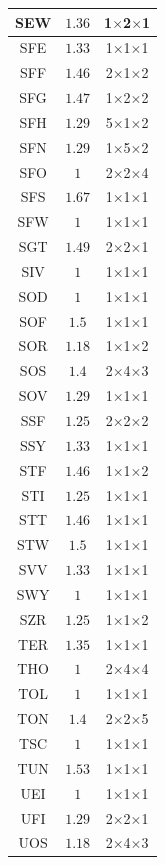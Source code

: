 \documentclass[main.tex]{subfiles}
\begin{document}
\begin{table}
{\begin{minipage}[t]{0.24\linewidth}
\begin{tabular}{|@{\hspace{2pt}}c@{\hspace{2pt}}|@{\hspace{2pt}}c@{\hspace{2pt}}|@{\hspace{2pt}}c@{\hspace{5pt}}|}
SEW&$1.36$&1$\times$2$\times$1\\\hline
SFE&$1.33$&1$\times$1$\times$1\\\hline
SFF&$1.46$&2$\times$1$\times$2\\\hline
SFG&$1.47$&1$\times$2$\times$2\\\hline
SFH&$1.29$&5$\times$1$\times$2\\\hline
SFN&$1.29$&1$\times$5$\times$2\\\hline
SFO&$1$&2$\times$2$\times$4\\\hline
SFS&$1.67$&1$\times$1$\times$1\\\hline
SFW&$1$&1$\times$1$\times$1\\\hline
SGT&$1.49$&2$\times$2$\times$1\\\hline
SIV&$1$&1$\times$1$\times$1\\\hline
SOD&$1$&1$\times$1$\times$1\\\hline
SOF&$1.5$&1$\times$1$\times$1\\\hline
SOR&$1.18$&1$\times$1$\times$2\\\hline
SOS&$1.4$&2$\times$4$\times$3\\\hline
SOV&$1.29$&1$\times$1$\times$1\\\hline
SSF&$1.25$&2$\times$2$\times$2\\\hline
SSY&$1.33$&1$\times$1$\times$1\\\hline
STF&$1.46$&1$\times$1$\times$2\\\hline
STI&$1.25$&1$\times$1$\times$1\\\hline
STT&$1.46$&1$\times$1$\times$1\\\hline
STW&$1.5$&1$\times$1$\times$1\\\hline
SVV&$1.33$&1$\times$1$\times$1\\\hline
SWY&$1$&1$\times$1$\times$1\\\hline
SZR&$1.25$&1$\times$1$\times$2\\\hline
TER&$1.35$&1$\times$1$\times$1\\\hline
THO&$1$&2$\times$4$\times$4\\\hline
TOL&$1$&1$\times$1$\times$1\\\hline
TON&$1.4$&2$\times$2$\times$5\\\hline
TSC&$1$&1$\times$1$\times$1\\\hline
TUN&$1.53$&1$\times$1$\times$1\\\hline
UEI&$1$&1$\times$1$\times$1\\\hline
UFI&$1.29$&2$\times$2$\times$1\\\hline
UOS&$1.18$&2$\times$4$\times$3\\\hline

\end{tabular}
\end{minipage}}
\end{table}
\end{document}
